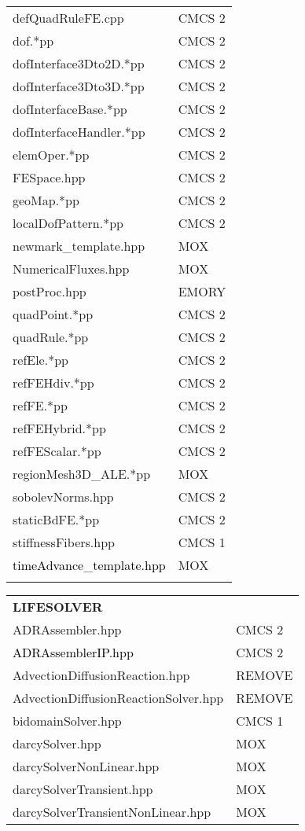 \documentclass[10p]{article}
\newcommand{\newparts}[1]{\textcolor{black}{#1}}
\newcommand{\newpartsVC}[1]{\textcolor{black}{#1}}
\theoremstyle{definition}
\begin{document}
\begin{landscape}
\begin{table}[!h]
\begin{multicols}{4}
\begin{xtabular}{
p{0.18\textwidth}<{}|
p{0.1\textwidth}<{}
}
defQuadRuleFE.cpp & CMCS 2\\
dof.*pp & CMCS 2\\
dofInterface3Dto2D.*pp & CMCS 2\\
dofInterface3Dto3D.*pp & CMCS 2\\
dofInterfaceBase.*pp & CMCS 2\\
dofInterfaceHandler.*pp & CMCS 2\\
elemOper.*pp & CMCS 2\\
FESpace.hpp & CMCS 2\\
geoMap.*pp & CMCS 2\\
localDofPattern.*pp & CMCS 2\\
newmark\_template.hpp & MOX\\
NumericalFluxes.hpp & MOX\\
postProc.hpp & EMORY\\
quadPoint.*pp & CMCS 2\\
quadRule.*pp & CMCS 2\\
refEle.*pp & CMCS 2\\
refFEHdiv.*pp & CMCS 2\\
refFE.*pp & CMCS 2\\
refFEHybrid.*pp & CMCS 2\\
refFEScalar.*pp & CMCS 2\\
regionMesh3D\_ALE.*pp & MOX\\
sobolevNorms.hpp & CMCS 2\\
staticBdFE.*pp & CMCS 2\\
stiffnessFibers.hpp & CMCS 1\\
\newpartsVC{timeAdvance\_template.hpp} & MOX\\
& \\
\end{xtabular}
\begin{xtabular}{
p{0.28\textwidth}<{}|
p{0.1\textwidth}<{}
}
\textbf{LIFESOLVER} \\
ADRAssembler.hpp & CMCS 2\\
\newparts{ADRAssemblerIP.hpp} & CMCS 2\\
AdvectionDiffusionReaction.hpp & REMOVE\\
AdvectionDiffusionReactionSolver.hpp & REMOVE\\
bidomainSolver.hpp & CMCS 1\\
darcySolver.hpp & MOX\\
darcySolverNonLinear.hpp & MOX\\
darcySolverTransient.hpp & MOX\\
darcySolverTransientNonLinear.hpp & MOX\\

\end{xtabular}
\end{multicols}
\end{table}
\end{landscape}
\end{document}
